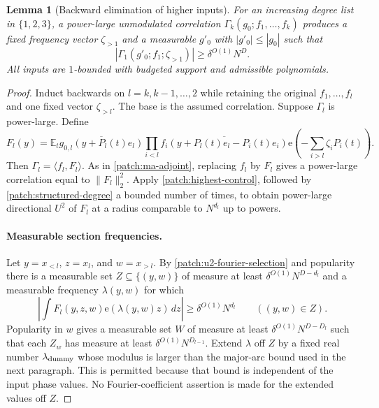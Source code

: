 \documentclass[11pt]{article}
\newtheorem{lemma}[lemma]{Lemma}
\theoremstyle{definition}
\newcommand{\ee}[1]{\mathrm e\!\left(#1\right)}
\begin{document}
\begin{lemma}[Backward elimination of higher inputs]\label{patch:remove-high-inputs}
For an increasing degree list in $\{1,2,3\}$, a power-large unmodulated correlation
$\Gamma_k(g_0;f_1,\ldots,f_k)$ produces a fixed frequency vector $\zeta_{>1}$ and a
measurable $g'_0$ with $|g'_0|\leq|g_0|$ such that
\[
 |\Gamma_1(g'_0;f_1;\zeta_{>1})|\geq\delta^{O(1)}N^D.
\]
All inputs are $1$-bounded with budgeted support and admissible polynomials.
\end{lemma}
\begin{proof}
Induct backwards on $l=k,k-1,\ldots,2$ while retaining the original $f_1,\ldots,f_l$ and
one fixed vector $\zeta_{>l}$.  The base is the assumed correlation.
Suppose $\Gamma_l$ is power-large.  Define
\[
 F_l(y)=\mathbb E_t\overline{g_{0,l}(y+P_l(t)e_l)}
          \prod_{i<l}\overline{f_i(y+P_l(t)e_l-P_i(t)e_i)}
                           \ee{-\sum_{i>l}\zeta_iP_i(t)}.
\]
Then $\Gamma_l=\langle f_l,F_l\rangle$.  As in \eqref{patch:ma-adjoint}, replacing $f_l$
by $F_l$ gives a power-large correlation equal to $\|F_l\|_2^2$.
Apply \cref{patch:highest-control}, followed by \cref{patch:structured-degree} a bounded
number of times, to obtain power-large directional $U^2$ of $F_l$ at a radius comparable
to $N^{d_l}$ up to powers.

\paragraph{Measurable section frequencies.}
Let $y=x_{<l}$, $z=x_l$, and $w=x_{>l}$.
By \cref{patch:u2-fourier-selection} and popularity there is a measurable set
$Z\subseteq\{(y,w)\}$ of measure at least $\delta^{O(1)}N^{D-d_l}$ and a measurable
frequency $\lambda(y,w)$ for which
\begin{equation}\label{patch:high-section-coeff}
 \left|\int F_l(y,z,w)\ee{\lambda(y,w)z}\,dz\right|
                                  \geq\delta^{O(1)}N^{d_l}\qquad((y,w)\in Z).
\end{equation}
Popularity in $w$ gives a measurable set $W$ of measure at least
$\delta^{O(1)}N^{D-D_l}$ such that each $Z_w$ has measure at least
$\delta^{O(1)}N^{D_{l-1}}$.
Extend $\lambda$ off $Z$ by a fixed real number $\lambda_{\rm dummy}$ whose modulus is
larger than the major-arc bound used in the next paragraph.  This is permitted because that
bound is independent of the input phase values.  No Fourier-coefficient assertion is made
for the extended values off $Z$.


\end{proof}
\end{document}
